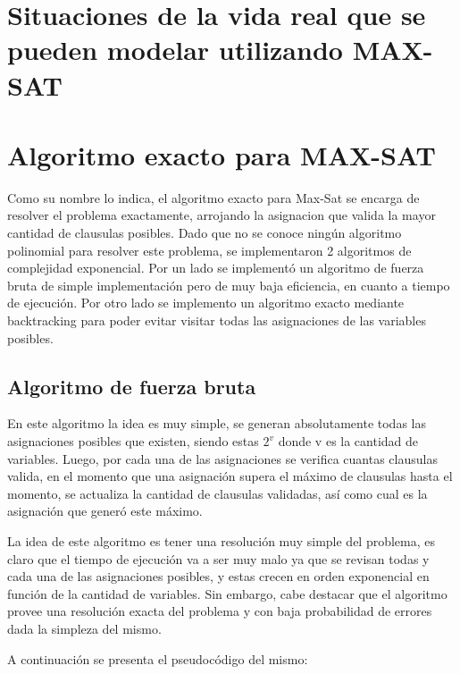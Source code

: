 \documentclass[a4paper,10pt]{article}
\begin{document}
\section*{Situaciones de la vida real que se pueden modelar utilizando MAX-SAT}




\section*{Algoritmo exacto para MAX-SAT}
Como su nombre lo indica, el algoritmo exacto para Max-Sat se encarga de resolver el problema exactamente, arrojando la asignacion que valida la mayor cantidad de clausulas posibles. Dado que no se conoce ning\'un algoritmo polinomial para resolver este problema, se implementaron 2 algoritmos de complejidad exponencial. Por un lado se implement\'o un algoritmo de fuerza bruta de simple implementaci\'on pero de muy baja eficiencia, en cuanto a tiempo de ejecuci\'on. Por otro lado se implemento un algoritmo exacto mediante backtracking para poder evitar visitar todas las asignaciones de las variables posibles.

\subsection*{Algoritmo de fuerza bruta}
En este algoritmo la idea es muy simple, se generan absolutamente todas las asignaciones posibles que existen, siendo estas $2^{v}$ donde v es la cantidad de variables. Luego, por cada una de las asignaciones se verifica cuantas clausulas valida, en el momento que una asignaci\'on supera el m\'aximo de clausulas hasta el momento, se actualiza la cantidad de clausulas validadas, as\'i como cual es la asignaci\'on que gener\'o este m\'aximo.

La idea de este algoritmo es tener una resoluci\'on muy simple del problema, es claro que el tiempo de ejecuci\'on va a ser muy malo ya que se revisan todas y cada una de las asignaciones posibles, y estas crecen en orden exponencial en funci\'on de la cantidad de variables. Sin embargo, cabe destacar que el algoritmo provee una resoluci\'on exacta del problema y con baja probabilidad de errores dada la simpleza del mismo.

A continuaci\'on se presenta el pseudoc\'odigo del mismo:
\end{document}
